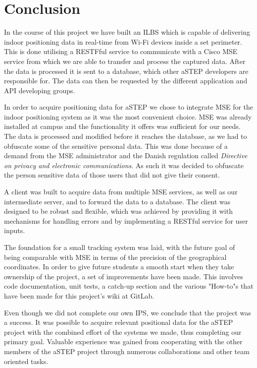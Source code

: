 \chapter{Conclusion}
In the course of this project we have built an ILBS which is capable of delivering indoor positioning data in real-time from Wi-Fi devices inside a set perimeter. This is done utilising a RESTFful service to communicate with a Cisco MSE service from which we are able to transfer and process the captured data. After the data is processed it is sent to a database, which other aSTEP developers are responsible for. The data can then be requested by the different application and API developing groups.

In order to acquire positioning data for aSTEP we chose to integrate MSE for the indoor positioning system as it was the most convenient choice. MSE was already installed at campus and the functionality it offers was sufficient for our needs. The data is processed and modified before it reaches the database, as we had to obfuscate some of the sensitive personal data. This was done because of a demand from the MSE administrator and the Danish regulation called \textit{Directive on privacy and electronic communications}. As such it was decided to obfuscate the person sensitive data of those users that did not give their consent.

A client was built to acquire data from multiple MSE services, as well as our intermediate server, and to forward the data to a database. The client was designed to be robust and flexible, which was achieved by providing it with mechanisms for handling errors and by implementing a RESTful service for user inputs.

The foundation for a small tracking system was laid, with the future goal of being comparable with MSE in terms of the precision of the geographical coordinates. %
In order to give future students a smooth start when they take ownership of the project, a set of improvements have been made. This involves code documentation, unit tests, a catch-up section and the various "How-to"s that have been made for this project's wiki at GitLab. 

Even though we did not complete our own IPS, we conclude that the project was a success. It was possible to acquire relevant positional data for the aSTEP project with the combined effort of the systems we made, thus completing our primary goal. Valuable experience was gained from cooperating with the other members of the aSTEP project through numerous collaborations and other team oriented tasks.

